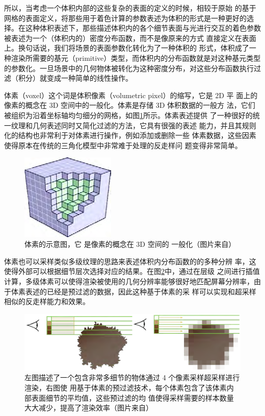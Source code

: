 所以，当考虑一个体积内部的这些复杂的表面的定义的时候，相较于原始 的基于网格的表面定义，将那些用于着色计算的参数表述为体积的形式是一种更好的选择。在这种体积表述下，那些描述体积内的各个细节表面与光进行交互的着色参数被表述为一个（体积内的）密度分布函数，而不是像原来的方式 直接定义在表面上。换句话说，我们将场景的表面参数化转化为了一种体积的 形式，体积成了一种渲染所需要的基元（primitive）类型，而体积内的分布函数就是对这种基元类型的参数化。一旦场景中的几何物体被转化为这种密度分布，对这些分布函数执行过滤（积分）就变成一种简单的线性操作。

体素（voxel）这个词是体积像素（volumetric pixel）的缩写，它是 2D 平 面上的像素的概念在 3D 空间中的一般化。体素是存储 3D 体积数据的一般方 法，它们被组织为沿着坐标轴均匀细分的网格，如图\ref{f:vct-4-2}所示。体素表述提供 了一种很好的统一纹理和几何表述同时又简化过滤的方法，它具有很强的表述 能力，并且其规则化的结构也非常利于对体素进行操作，例如添加或删除一些 体素数据，这些因素使得原本在传统的三角化模型中非常难于处理的反走样问 题变得非常简单。

\begin{figure}
\sidecaption
	\includegraphics[width=0.4\textwidth]{figures/vct/vct-4-2}
	\caption{体素的示意图，它 是像素的概念在 3D 空间的 一般化（图片来自\cite{a:InteractiveIndirectIlluminationUsingVoxelConeTracing}）}
	\label{f:vct-4-2}
\end{figure}

体素也可以采样类似多级纹理的思路来表述体积内分布函数的的多种分辨 率，这使得外部可以根据细节层次选择对应的结果。在图\ref{f:vct-4-3}中，通过在层级 之间进行插值计算，多级体素可以使得渲染被使用的几何分辨率能够很好地匹配屏幕分辨率，由于体素表述的已经是预过滤的数据，因此这种基于体素的采 样可以实现和超采样相似的反走样能力和效果。

\begin{figure}
	\includegraphics[width=\textwidth]{figures/vct/vct-4-3}
	\caption{左图描述了一个包含非常多细节的物体通过 4 个像素采样超采样进行渲染，右图使 用基于体素的预过滤技术，每个体素包含了该体素内部表面细节的平均值，这些预过滤的均 值使得采样需要的样本数量大大减少，提高了渲染效率（图片来自\cite{a:InteractiveIndirectIlluminationUsingVoxelConeTracing}）}
	\label{f:vct-4-3}
\end{figure}



